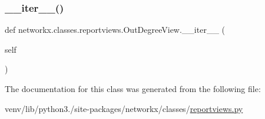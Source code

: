 \mbox{\label{classnetworkx_1_1classes_1_1reportviews_1_1OutDegreeView_a71dfdba607c83f5504b5c07091ed1718}} 
\subsubsection{\texorpdfstring{\+\_\+\+\_\+iter\+\_\+\+\_\+()}{\_\_iter\_\_()}}
{\footnotesize\ttfamily def networkx.\+classes.\+reportviews.\+Out\+Degree\+View.\+\_\+\+\_\+iter\+\_\+\+\_\+ (\begin{DoxyParamCaption}\item[{}]{self }\end{DoxyParamCaption})}



The documentation for this class was generated from the following file\+:\begin{DoxyCompactItemize}
\item 
venv/lib/python3./site-\/packages/networkx/classes/\hyperlink{reportviews_8py}{reportviews.\+py}\end{DoxyCompactItemize}
